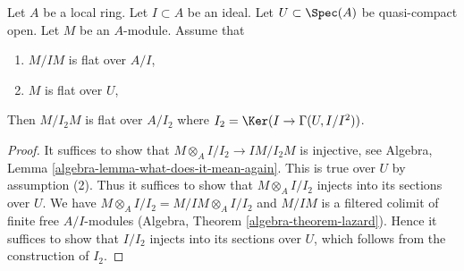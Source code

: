 \begin{lemma}
\label{lemma-make-smaller-flatness-ideal}
Let $A$ be a local ring. Let $I \subset A$ be an ideal.
Let $U \subset \Spec(A)$ be quasi-compact open.
Let $M$ be an $A$-module. Assume that
\begin{enumerate}
\item $M/IM$ is flat over $A/I$,
\item $M$ is flat over $U$,
\end{enumerate}
Then $M/I_2M$ is flat over $A/I_2$ where
$I_2 = \Ker(I \to \Gamma(U, I/I^2))$.
\end{lemma}

\begin{proof}
It suffices to show that
$M \otimes_A I/I_2 \to IM/I_2M$ is injective, see
Algebra, Lemma \ref{algebra-lemma-what-does-it-mean-again}.
This is true over $U$ by assumption (2). Thus it suffices to show
that $M \otimes_A I/I_2$ injects into its sections over $U$.
We have $M \otimes_A I/I_2 = M/IM \otimes_A I/I_2$ and
$M/IM$ is a filtered colimit of finite free $A/I$-modules
(Algebra, Theorem \ref{algebra-theorem-lazard}).
Hence it suffices to show that $I/I_2$ injects into its sections
over $U$, which follows from the construction of $I_2$.
\end{proof}
